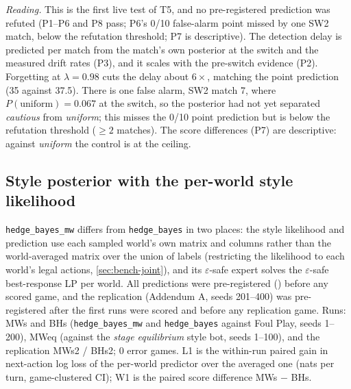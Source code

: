\documentclass[10pt]{article}
\theoremstyle{plain}
\theoremstyle{definition}
\theoremstyle{remark}
\newcommand{\src}[1]{\path{#1}}
\begin{document}
\emph{Reading.} This is the first live test of T5, and no pre-registered prediction was refuted (P1--P6 and P8 pass; P6's 0/10 false-alarm point missed by one SW2 match, below the refutation threshold; P7 is descriptive). The detection delay
is predicted per match from the match's own posterior at the switch and the measured drift rates (P3), and it
scales with the pre-switch evidence (P2). Forgetting at $\lambda=0.98$ cuts the delay about $6\times$, matching the point
prediction (35 against 37.5). There is one false alarm, SW2 match 7, where $P(\text{uniform})=0.067$ at the switch, so the
posterior had not yet separated \emph{cautious} from \emph{uniform}; this misses the 0/10 point prediction but is below the
refutation threshold ($\ge2$ matches). The score differences (P7) are descriptive: against \emph{uniform} the control is
at the ceiling.

\subsection{Style posterior with the per-world style likelihood}\label{sec:bench-mw}

\texttt{hedge\_bayes\_mw} differs from \texttt{hedge\_bayes} in two places: the style likelihood and prediction use each
sampled world's own matrix and columns rather than the world-averaged matrix over the union of labels (restricting the likelihood to each world's legal actions,
\cref{sec:bench-joint}), and its $\varepsilon$-safe expert solves the $\varepsilon$-safe best-response LP per world. All
predictions were pre-registered (\src{research/prereg_mw.md}) before any scored game, and the replication (Addendum A,
seeds 201--400) was pre-registered after the first runs were scored and before any replication game. Runs: MWs and BHs
(\texttt{hedge\_bayes\_mw} and \texttt{hedge\_bayes} against Foul Play, seeds 1--200), MWeq (against the \emph{stage equilibrium} style bot,
seeds 1--100), and the replication MWs2 / BHs2; 0 error games. L1 is the within-run paired gain in next-action log loss of
the per-world predictor over the averaged one (nats per turn, game-clustered CI); W1 is the paired score difference MWs
$-$ BHs.
\end{document}
